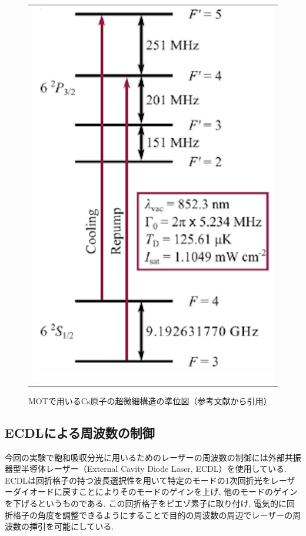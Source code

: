 \documentclass[uplatex, dvipdfmx, a4paper, report, papersize, 11pt]{jsbook}
\begin{document}
\begin{figure}[htpb]
  \centering
    \begin{tabular}{c}
      \begin{minipage}{1\hsize}
        \centering
          \includegraphics[keepaspectratio,  scale=0.35,  angle=0]
                          {figures/saturated-absorption/Cs_level_diagram_MOT.png}
                          \caption{MOTで用いるCs原子の超微細構造の準位図（参考文献\cite{Cs_level_diagram}から引用）}
                          \label{Cs_level_diagram_MOT}
      \end{minipage}
    \end{tabular}
\end{figure}
\subsection{ECDLによる周波数の制御}
今回の実験で飽和吸収分光に用いるためのレーザーの周波数の制御には外部共振器型半導体レーザー（External Cavity Diode Laser, ECDL）を使用している. ECDLは回折格子の持つ波長選択性を用いて特定のモードの1次回折光をレーザーダイオードに戻すことによりそのモードのゲインを上げ, 他のモードのゲインを下げるというものである. この回折格子をピエゾ素子に取り付け, 電気的に回折格子の角度を調整できるようにすることで目的の周波数の周辺でレーザーの周波数の挿引を可能にしている.
\end{document}
